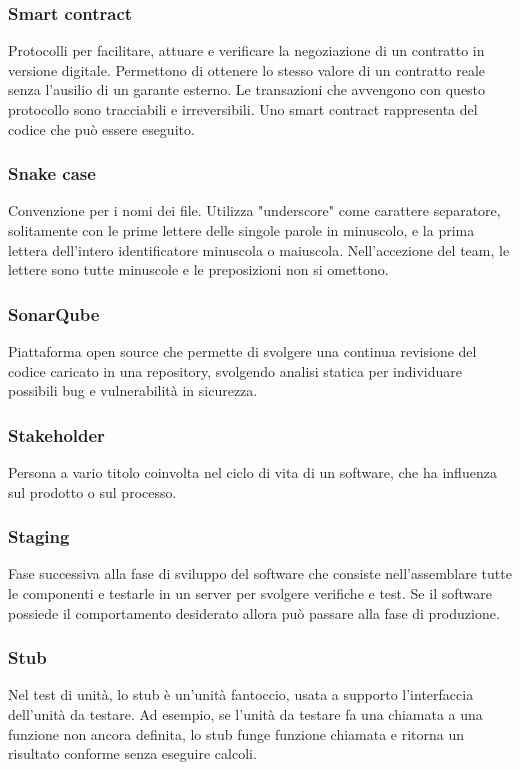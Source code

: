 \subsubsection*{Smart contract}
Protocolli per facilitare, attuare e verificare la negoziazione di un contratto in versione digitale. Permettono di ottenere lo stesso valore di un contratto reale senza l'ausilio di un garante esterno. Le transazioni che avvengono con questo protocollo sono tracciabili e irreversibili. Uno smart contract rappresenta del codice che può essere eseguito.

\subsubsection*{Snake case}
Convenzione per i nomi dei file. Utilizza "underscore" come carattere separatore, solitamente con le prime lettere delle singole parole in minuscolo, e la prima lettera dell'intero identificatore minuscola o maiuscola.
Nell'accezione del team, le lettere sono tutte minuscole e le preposizioni non si omettono.

\subsubsection*{SonarQube}
Piattaforma open source che permette di svolgere una continua revisione del codice caricato in una repository, svolgendo analisi statica per individuare possibili bug e vulnerabilità in sicurezza.

\subsubsection*{Stakeholder}
Persona a vario titolo coinvolta nel ciclo di vita di un software, che ha influenza sul prodotto o sul processo.

\subsubsection*{Staging}
Fase successiva alla fase di sviluppo del software che consiste nell'assemblare tutte le componenti e testarle in un server per svolgere verifiche e test. Se il software possiede il comportamento desiderato allora può passare alla fase di produzione.

\subsubsection*{Stub}
Nel test di unità, lo stub è un'unità fantoccio, usata a supporto l'interfaccia dell'unità da testare. Ad esempio, se l'unità da testare fa una chiamata a una funzione non ancora definita, lo stub funge funzione chiamata e ritorna un risultato conforme senza eseguire calcoli.
